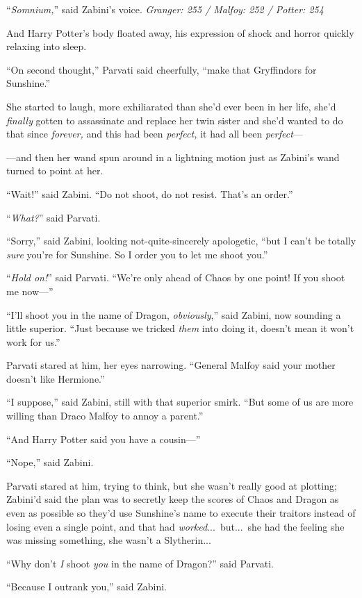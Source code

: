 “\emph{Somnium,}” said Zabini’s voice.
\sbreak
\emph{Granger: 255 / Malfoy: 252 / Potter: 254}

And Harry Potter’s body floated away, his expression of shock and horror quickly relaxing into sleep.

“On second thought,” Parvati said cheerfully, “make that Gryffindors for Sunshine.”

She started to laugh, more exhiliarated than she’d ever been in her life, she’d \emph{finally} gotten to assassinate and replace her twin sister and she’d wanted to do that since \emph{forever,} and this had been \emph{perfect,} it had all been \emph{perfect}—

—and then her wand spun around in a lightning motion just as Zabini’s wand turned to point at her.

“Wait!” said Zabini. “Do not shoot, do not resist. That’s an order.”

“\emph{What?}” said Parvati.

“Sorry,” said Zabini, looking not-quite-sincerely apologetic, “but I can’t be totally \emph{sure} you’re for Sunshine. So I order you to let me shoot you.”

“\emph{Hold on!}” said Parvati. “We’re only ahead of Chaos by one point! If you shoot me now—”

“I’ll shoot you in the name of Dragon, \emph{obviously},” said Zabini, now sounding a little superior. “Just because we tricked \emph{them} into doing it, doesn’t mean it won’t work for us.”

Parvati stared at him, her eyes narrowing. “General Malfoy said your mother doesn’t like Hermione.”

“I suppose,” said Zabini, still with that superior smirk. “But some of us are more willing than Draco Malfoy to annoy a parent.”

“And Harry Potter said you have a cousin—”

“Nope,” said Zabini.

Parvati stared at him, trying to think, but she wasn’t really good at plotting; Zabini’d said the plan was to secretly keep the scores of Chaos and Dragon as even as possible so they’d use Sunshine’s name to execute their traitors instead of losing even a single point, and that had \emph{worked}...\ but...\ she had the feeling she was missing something, she wasn’t a Slytherin...

“Why don’t \emph{I} shoot \emph{you} in the name of Dragon?” said Parvati.

“Because I outrank you,” said Zabini.

